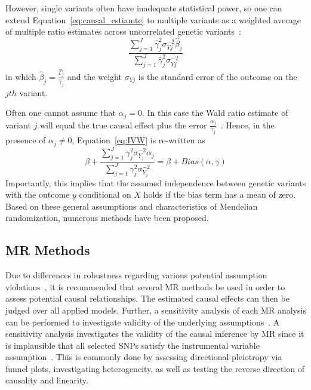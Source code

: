 However, single variants often have inadequate statistical power, so one can extend Equation~\ref{eq:causal_estiamte} to multiple variants as a weighted average of multiple ratio estimates across uncorrelated genetic variants~\cite{Bowden2015}:
\begin{equation} \label{eq:IVW}
  \frac{\sum^J_{j=1} \hat{\gamma}_j^2\sigma_{Yj}^{-2} \hat{\beta}_j}
  {\sum^J_{j=1} \hat{\gamma}_j^2\sigma_{Yj}^{-2}}
\end{equation}
in which $\hat{\beta}_j = \frac{\hat{\Gamma}_j}{\hat{\gamma}_j}$ and the weight $\sigma_{Yj}$ is the standard error of the outcome on the $jth$ variant.

Often one cannot assume that $\alpha_j = 0$.
In this case the Wald ratio estimate of variant $j$ will equal the true causal effect plus the error $\frac{\alpha_j}{\gamma_j}$~\cite{Bowden2015}. 
Hence, in the presence of $\alpha_j \neq 0$, Equation~\ref{eq:IVW} is re-written as
\begin{equation} \label{eq:TSLSbias}
  \beta + \frac{\sum^J_{j=1} \gamma_j^2\sigma_{Y_j}^{-2} \alpha_j}
  {\sum^J_{j=1} \gamma_j^2\sigma_{Y_j}^{-2}} = \beta + Bias(\alpha, \gamma)
\end{equation}
Importantly, this implies that the assumed independence between genetic variants with the outcome $y$ conditional on $X$ holds if the bias term has a mean of zero.
Based on these general assumptions and characteristics of Mendelian randomization, numerous methods have been proposed.

\subsection{MR Methods}
\label{sub:Used_Methods}

Due to differences in robustness regarding various potential assumption violations~\citet{Burgess2016}, it is recommended that several MR methods be used in order to assess potential causal relationships.
The estimated causal effects can then be judged over all  applied models.
Further, a sensitivity analysis of each MR analysis can be performed to investigate validity of the underlying assumptions~\cite{Burgess2016}.
A sensitivity analysis investigates the validity of the causal inference by MR since it is implausible that all selected SNPs satisfy the instrumental variable assumption~\cite{Burgess2016}.
This is commonly done by assessing directional pleiotropy via funnel plots, investigating heterogeneity, as well as testing the reverse direction of causality and linearity.

